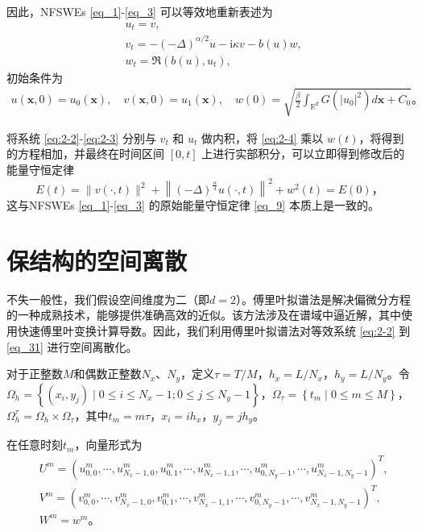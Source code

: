 因此，NFSWEs \eqref{eq_1}-\eqref{eq_3} 可以等效地重新表述为
\begin{align}
& u_t=v, \label{eq:2-2}\\
& v_t=-(-\Delta)^{\alpha / 2} u-\mathrm{i}\kappa v-b(u) w, \label{eq:2-3}\\
& w_t=\Re\left(b(u), u_t\right),\label{eq:2-4}
\end{align}
初始条件为
\begin{align}\label{eq_31}
u(\boldsymbol{x}, 0)=u_{0}(\boldsymbol{x}), \quad v(\boldsymbol{x}, 0)=u_{1}(\boldsymbol{x}), \quad w(0)=\sqrt{\frac{\beta}{2} \int_{\mathbb{R}^d} G\left(|u_{0}|^2\right) d \boldsymbol{x} +C_0}。
\end{align}

将系统 \eqref{eq:2-2}-\eqref{eq:2-3} 分别与 $v_t$ 和 $u_t$ 做内积，将 \eqref{eq:2-4} 乘以 $w(t)$，将得到的方程相加，并最终在时间区间 $[0, t]$ 上进行实部积分，可以立即得到修改后的能量守恒定律
\begin{equation}
E(t)=\|v(\cdot, t)\|^2+\left\|(-\Delta)^{\frac{\alpha}{4}} u(\cdot, t)\right\|^{2}+w^2(t)=E(0)，
\end{equation}
这与NFSWEs \eqref{eq_1}-\eqref{eq_3} 的原始能量守恒定律 \eqref{eq_9} 本质上是一致的。

\section{保结构的空间离散}\label{Section 3}
不失一般性，我们假设空间维度为二（即$d=2$）。傅里叶拟谱法是解决偏微分方程的一种成熟技术，能够提供准确高效的近似。该方法涉及在谱域中逼近解，其中使用快速傅里叶变换计算导数。因此，我们利用傅里叶拟谱法对等效系统 \eqref{eq:2-2} 到 \eqref{eq_31} 进行空间离散化。

对于正整数$M$和偶数正整数$N_{x}$、$N_{y}$，定义$\tau={T}/{M}$，$h_{x}={L}/{N_{x}}$，$h_{y}={L}/{N_{y}}$。令$\Omega_{h}=\left\{(x_{i}, y_{j}) \mid 0 \leq i \leq N_x-1;0 \leq j \leq N_y-1\right\}$，$\Omega_{\tau}=\left\{t_{m} \mid 0 \leq m \leq M\right\}$，$\Omega_{h}^{\tau}=\Omega_{h} \times \Omega_{\tau}$，其中$t_{m}=m \tau$，$x_{i}=i h_{x}$，$y_{j}=j h_{y}$。

在任意时刻$t_m$，向量形式为
\begin{align}\label{eq_47}
&U^m=\left(u_{0,0}^m, \cdots, u_{N_{x}-1,0}^m, u_{0,1}^m, \cdots, u_{N_{x}-1,1}^m, \cdots, u_{0, N_{y}-1}^m, \cdots, u_{N_{x}-1, N_{y}-1}^m\right)^{T},\\
&V^m=\left(v_{0,0}^m, \cdots, v_{N_{x}-1,0}^m, v_{0,1}^m, \cdots, v_{N_{x}-1,1}^m, \cdots, v_{0, N_{y}-1}^m, \cdots, v_{N_{x}-1, N_{y}-1}^m\right)^{T},\\
&W^m=w^m。
\end{align}

